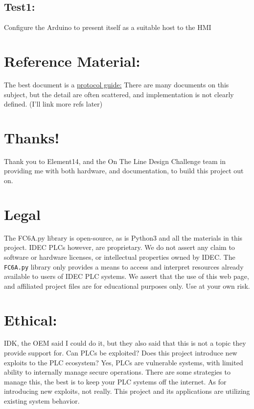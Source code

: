 \documentclass[12pt]{article}
\begin{document}
\subsection*{Test1:}
Configure the Arduino to present itself as a suitable host to the HMI




\section*{Reference Material:}
The best document is a \href{https://github.com/Makerspace-Bangor/fc6a/blob/main/fc4a_protocol_im.pdf}{protocol guide:}
There are many documents on this subject, but the detail are often scattered, and implementation is not clearly defined.
(I'll link more refs later)  
\section*{Thanks!}
Thank you to Element14, and the On The Line Design Challenge team in providing me with both hardware, and documentation, to build this project out on.

\section*{Legal}
The FC6A.py library is open-source, as is Python3 and all the materials in this project.  
IDEC PLCs however, are proprietary. We do not assert any claim to software or hardware licenses, or intellectual properties owned by IDEC.  
The \texttt{FC6A.py} library only provides a means to access and interpret resources already available to users of IDEC PLC systems. We assert that the use of this web page, and affiliated project files are for educational purposes only. Use at your own risk. 

\section*{Ethical:}
IDK, the OEM said I could do it, but they also said that this is not a topic they provide support for. Can PLCs be exploited? Does this project introduce new exploits to the PLC ecosystem? Yes, PLCs are vulnerable systems, with limited ability to internally manage secure operations. There are some strategies to manage this, the best is to keep your PLC systems off the internet.  As for introducing new exploits, not really. This project and its applications are utilizing  existing system behavior. 
\end{document}
